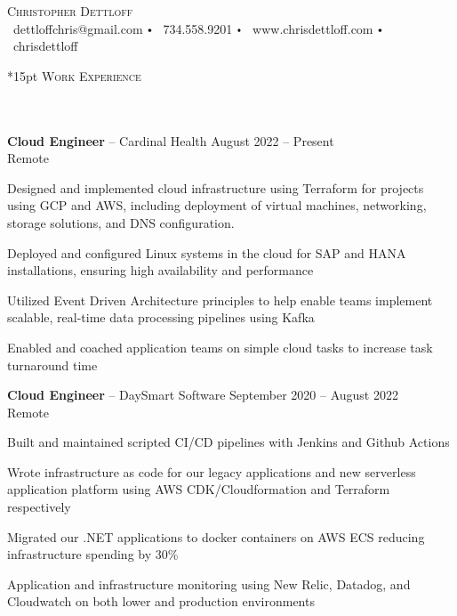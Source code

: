 \documentclass{article}
\newcommand{\contact}[3]{
\vspace*{5pt}
\begin{center}
{\LARGE \scshape {#1}}\\
\vspace{3pt}
#2 
\vspace{2pt}
#3
\end{center}
\vspace*{-8pt}
}
\newcommand{\header}[1]{{
\hspace*{-15pt}\vspace*{6pt} \textsc{#1}} \vspace*{-6pt} 
\lineunder
}
\newcommand{\lineunder}{
\vspace*{-8pt} \\ \hspace*{-18pt} 
\hrulefill \\
}
\newcommand{\employer}[4]{{
\vspace*{2pt}%
\textbf{#1} #2 \hfill #3\\ #4 \vspace*{2pt}}
}
\renewcommand{\labelitemi}{
$\vcenter{\hbox{\tiny$\bullet$}}$\hspace*{3pt}
}
\renewcommand{\labelitemii}{
$\vcenter{\hbox{\tiny$\bullet$}}$\hspace*{-3pt}
}
\newenvironment{bullet-list-minor}{
\begin{list}{\labelitemii}{\setlength\leftmargin{15pt} 
\topsep 0pt \itemsep -2pt}}{\vspace*{4pt}\end{list}
}
\begin{document}
\small
\smallskip
\vspace*{-44pt}

\contact{Christopher Dettloff}
{\faEnvelope\ dettloffchris@gmail.com \labelitemi \faPhone\ 734.558.9201 \labelitemi \faHome\ www.chrisdettloff.com \labelitemi \faGithub\ chrisdettloff }

\vspace*{15pt}%
\header{Work Experience}

    \employer{Cloud Engineer}{-- Cardinal Health}{August 2022 -- Present}{Remote}
	\begin{bullet-list-minor}
	\item Designed and implemented cloud infrastructure using Terraform for projects using GCP and AWS, including deployment of virtual machines, networking, storage solutions, and DNS configuration.
	\vspace{2pt}
	\item Deployed and configured Linux systems in the cloud for SAP and HANA installations, ensuring high availability and performance
    \vspace{2pt}
	\item Utilized Event Driven Architecture principles to help enable teams implement scalable, real-time data processing pipelines using Kafka
    \vspace{2pt}
	\item Enabled and coached application teams on simple cloud tasks to increase task turnaround time
    \end{bullet-list-minor}
    
    \employer{Cloud Engineer}{-- DaySmart Software}{September 2020 -- August 2022}{Remote}
    \begin{bullet-list-minor}
    \item Built and maintained scripted CI/CD pipelines with Jenkins and Github Actions
    \vspace{2pt}
    \item Wrote infrastructure as code for our legacy applications and new serverless application platform using AWS CDK/Cloudformation and Terraform respectively
    \vspace{2pt}
    \item Migrated our .NET applications to docker containers on AWS ECS reducing infrastructure spending by 30\%
    \vspace{2pt}
    \item Application and infrastructure monitoring using New Relic, Datadog, and Cloudwatch on both lower and production environments
    \end{bullet-list-minor}
\end{document}
